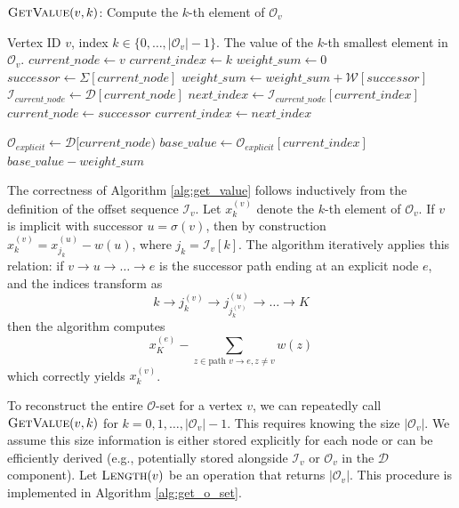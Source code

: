 \begin{algorithm}
    \caption{$\textsc{GetValue}(v, k)$: Compute the $k$-th element of $\mathcal{O}_v$}
    \label{alg:get_value}
    \small
    \begin{algorithmic}[1]
        \Require Vertex ID $v$, index $k \in \{0, \dots, |\mathcal{O}_v|-1\}$.
        \Ensure The value of the $k$-th smallest element in $\mathcal{O}_v$.
        \State $current\_node \gets v$
        \State $current\_index \gets k$
        \State $weight\_sum \gets 0$
        \State $successor \gets \Sigma[current\_node]$
        \State $weight\_sum \gets weight\_sum + \mathcal{W}[successor]$
        \State $\mathcal{I}_{current\_node} \gets \mathcal{D}[current\_node]$
        \State $next\_index \gets \mathcal{I}_{current\_node}[current\_index]$
        \State $current\_node \gets successor$
        \State $current\_index \gets next\_index$
        \EndWhile

        \State $\mathcal{O}_{explicit} \gets \mathcal{D}[current\_node)$
        \State $base\_value \gets \mathcal{O}_{explicit}[current\_index]$
        \State \Return $base\_value - weight\_sum$
    \end{algorithmic}
\end{algorithm}

The correctness of Algorithm \ref{alg:get_value} follows inductively from the definition of the offset sequence $\mathcal{I}_v$. Let $x_k^{(v)}$ denote the $k$-th element of $\mathcal{O}_v$. If $v$ is implicit with successor $u = \sigma(v)$, then by construction $x_k^{(v)} = x_{j_k}^{(u)} - w(u)$, where $j_k = \mathcal{I}_v[k]$. The algorithm iteratively applies this relation: if $v \to u \to \dots \to e$ is the successor path ending at an explicit node $e$, and the indices transform as
\[ k \to j_k^{(v)} \to j_{j_k^{(v)}}^{(u)} \to \dots \to K \]
then the algorithm computes
\[x_K^{(e)} - \sum_{z \in \text{path } v \to e, z \neq v} w(z)\]
which correctly yields $x_k^{(v)}$.

To reconstruct the entire $\mathcal{O}$-set for a vertex $v$, we can repeatedly call $\textsc{GetValue}(v, k)$ for $k=0, 1, \dots, |\mathcal{O}_v|-1$. This requires knowing the size $|\mathcal{O}_v|$. We assume this size information is either stored explicitly for each node or can be efficiently derived (e.g., potentially stored alongside $\mathcal{I}_v$ or $\mathcal{O}_v$ in the $\mathcal{D}$ component). Let $\textsc{Length}(v)$ be an operation that returns $|\mathcal{O}_v|$. This procedure is implemented in Algorithm \ref{alg:get_o_set}.

